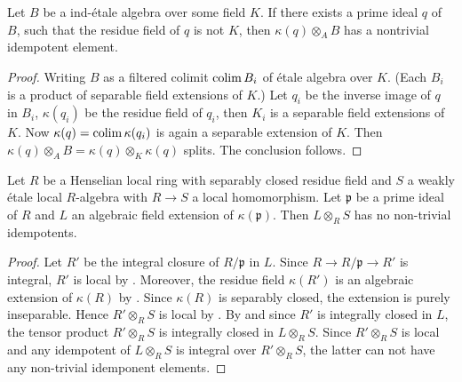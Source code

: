 \begin{lemma}
    \label{lem:idempotent-in-ind-etale-of-field-ext}
    Let $B$ be a ind-\'etale algebra over some field $K$. If there exists
    a prime ideal $q$ of $B$, such that the residue field of $q$ is not $K$, then
    $\kappa(q) \otimes_A B$ has a nontrivial idempotent element.
    \leanok
\end{lemma}

\begin{proof}
    Writing $B$ as a filtered colimit $\operatorname{colim} B_i$ of \'etale algebra over $K$. (Each $B_i$ is a
    product of separable field extensions of $K$.) Let $q_i$ be the inverse image of $q$ in $B_i$,
    $\kappa(q_i)$ be the residue field of $q_i$, then $K_i$ is a separable field extensions of $K$.
    Now $\kappa(q) = \operatorname{colim} \kappa(q_i)$ is again a separable extension of $K$. Then
    $\kappa(q) \otimes_A B = \kappa(q) \otimes_K \kappa(q)$ splits. The conclusion follows.
\end{proof}

\begin{lemma}
    Let $R$ be a Henselian local ring with separably closed residue field and $S$ a weakly étale local
    $R$-algebra with $R \to S$ a local homomorphism.
    Let $\mathfrak{p}$ be a prime ideal of $R$ and $L$ an algebraic field
    extension of $\kappa(\mathfrak{p})$. Then $L \otimes_{R} S$ has no non-trivial idempotents.
    \label{lemma:weakly-etale-over-sh-aux}
    \leanok
\end{lemma}

\begin{proof}
    Let $R'$ be the integral closure of $R / \mathfrak{p}$ in $L$. Since $R \to R / \mathfrak{p} \to R'$
    is integral, $R'$ is local by . Moreover,
    the residue field $\kappa(R')$ is an algebraic extension of $\kappa(R)$
    by . Since $\kappa(R)$ is
    separably closed, the extension is purely inseparable. Hence
    $R' \otimes_{R} S$ is local by . By
     and since $R'$ is integrally closed in $L$,
    the tensor product $R' \otimes_{R} S$ is integrally closed in $L \otimes_{R} S$.
    Since $R' \otimes_{R} S$ is local and any idempotent of $L \otimes_{R} S$ is integral over
    $R' \otimes_{R} S$, the latter can not have any non-trivial idemponent elements.
\end{proof}

